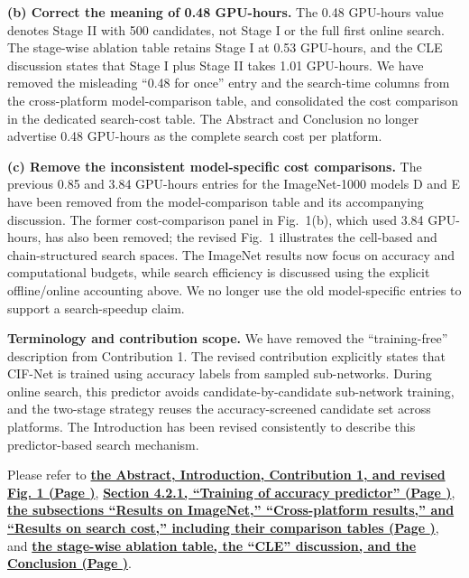 \documentclass[11pt]{article}
\newcommand{\finishresponse}{\par\color{black}\vspace{5mm}}
\newcommand{\revloc}[1]{%
  \textcolor{revisionred}{\textbf{\uline{#1}}}}
\begin{document}
\begin{enumerate}[leftmargin=0pt,label={},itemsep=5mm]
\textbf{(b) Correct the meaning of 0.48 GPU-hours.} The 0.48 GPU-hours value denotes Stage II with 500 candidates, not Stage I or the full first online search. The stage-wise ablation table retains Stage I at 0.53 GPU-hours, and the CLE discussion states that Stage I plus Stage II takes 1.01 GPU-hours. We have removed the misleading ``0.48 for once'' entry and the search-time columns from the cross-platform model-comparison table, and consolidated the cost comparison in the dedicated search-cost table. The Abstract and Conclusion no longer advertise 0.48 GPU-hours as the complete search cost per platform.

\textbf{(c) Remove the inconsistent model-specific cost comparisons.} The previous 0.85 and 3.84 GPU-hours entries for the ImageNet-1000 models D and E have been removed from the model-comparison table and its accompanying discussion. The former cost-comparison panel in Fig.~1(b), which used 3.84 GPU-hours, has also been removed; the revised Fig.~1 illustrates the cell-based and chain-structured search spaces. The ImageNet results now focus on accuracy and computational budgets, while search efficiency is discussed using the explicit offline/online accounting above. We no longer use the old model-specific entries to support a search-speedup claim.

\textbf{Terminology and contribution scope.} We have removed the ``training-free'' description from Contribution 1. The revised contribution explicitly states that CIF-Net is trained using accuracy labels from sampled sub-networks. During online search, this predictor avoids candidate-by-candidate sub-network training, and the two-stage strategy reuses the accuracy-screened candidate set across platforms. The Introduction has been revised consistently to describe this predictor-based search mechanism.

Please refer to \revloc{the Abstract, Introduction, Contribution 1, and revised Fig. 1 (Page \underline{\hspace{1cm}})}, \revloc{Section 4.2.1, ``Training of accuracy predictor'' (Page \underline{\hspace{1cm}})}, \revloc{the subsections ``Results on ImageNet,'' ``Cross-platform results,'' and ``Results on search cost,'' including their comparison tables (Page \underline{\hspace{1cm}})}, and \revloc{the stage-wise ablation table, the ``CLE'' discussion, and the Conclusion (Page \underline{\hspace{1cm}})}.
\par\endgroup
\finishresponse


\end{enumerate}
\end{document}
